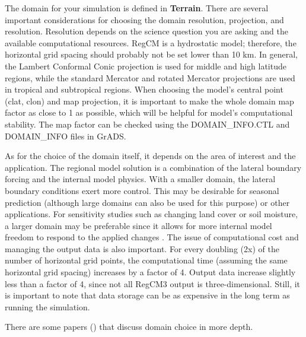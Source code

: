 The domain for your simulation is defined in {\bf Terrain}. There are several important considerations for choosing the domain
resolution, projection, and resolution. Resolution depends on the
science question you are asking and the available computational
resources. RegCM is a hydrostatic model; therefore, the horizontal grid
spacing should probably not be set lower than 10 km. In general, the
Lambert Conformal Conic projection is used for middle and high latitude
regions, while the standard Mercator and rotated Mercator projections
are used in tropical and subtropical regions.  When choosing the model's central point (clat, clon) and map projection, it is important to
make the whole domain map factor as close to 1 as possible, which will be helpful for model's computational stability. The map factor can be checked using the DOMAIN\_INFO.CTL and DOMAIN\_INFO files in GrADS.

As for the choice of the
domain itself, it depends on the area of interest and the application.
The regional model solution is a combination of the lateral boundary
forcing and the internal model physics. With a smaller domain, the
lateral boundary conditions exert more control. This may be desirable
for seasonal prediction (although large domains can also be used for this purpose) or other applications. For sensitivity studies
such as changing land cover or soil moisture, a larger domain may be
preferable since it allows for more internal model freedom to respond to
the applied changes \citep{Seth_98}. The issue of computational cost and managing the
output data is also important. For every doubling (2x) of the number of horizontal grid points, the computational time (assuming the same horizontal grid spacing) increases by a factor of 4. Output data increase slightly less than a factor of 4, since not all RegCM3 output is three-dimensional. Still, it is important to note that data storage can be as expensive in the long term as running the simulation. 

There are some papers (\citet{Seth_98,Vannitsem_05,Rauscher_06a})
that discuss domain choice in more depth.


